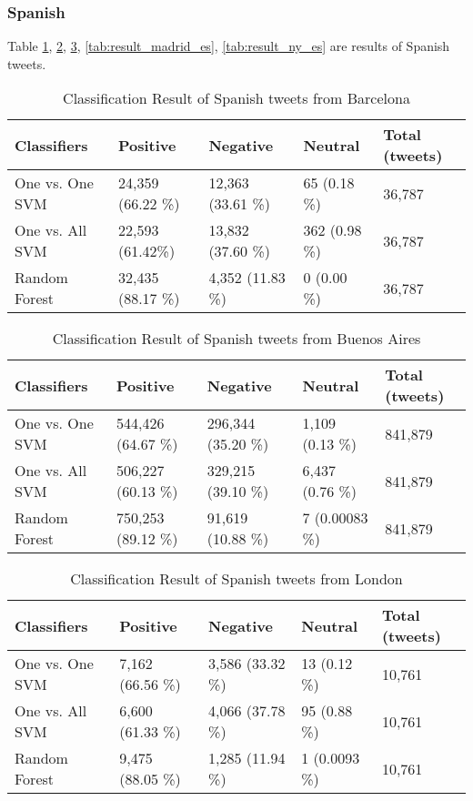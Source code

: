 \begin{comment}
London
N.Y or San Francisco

\end{comment}

\clearpage
\subsubsection{Spanish}
Table \ref{tab:result_barcelona_es}, \ref{tab:result_buenosaires_es}, \ref{tab:result_london_es}, \ref{tab:result_madrid_es}, \ref{tab:result_ny_es} are results of Spanish tweets.
\begin{table}[ht]
	\caption{Classification Result of Spanish tweets from Barcelona}
	\begin{tabular}{|l|p{1.8cm}|p{1.8cm}|p{1.8cm}|p{1.8cm}|} \hline
	Classifiers & Positive & Negative & Neutral & Total (tweets)\\ \hline
One vs. One SVM & 24,359 (66.22 \%)& 12,363 (33.61 \%)& 65 (0.18 \%) & 36,787\\ \hline
One vs. All SVM & 22,593 (61.42\%) & 13,832 (37.60 \%)& 362 (0.98 \%)& 36,787\\ \hline
Random Forest   & 32,435 (88.17 \%) & 4,352 (11.83 \%) & 0  (0.00 \%)& 36,787 \\ \hline
	\end{tabular}
	\label{tab:result_barcelona_es}
\end{table}


\begin{table}[ht]
	\caption{Classification Result of Spanish tweets from Buenos Aires}
	\begin{tabular}{|l|p{1.8cm}|p{1.8cm}|p{1.8cm}|p{1.8cm}|} \hline
	Classifiers & Positive & Negative & Neutral & Total (tweets)\\ \hline
One vs. One SVM & 544,426 (64.67 \%)& 296,344 (35.20 \%)& 1,109 (0.13 \%)& 841,879 \\ \hline
One vs. All SVM & 506,227 (60.13 \%)& 329,215 (39.10 \%)& 6,437 (0.76 \%)& 841,879 \\ \hline
Random Forest   & 750,253 (89.12 \%)& 91,619 (10.88 \%) & 7 (0.00083 \%) & 841,879 \\ \hline
	\end{tabular}
	\label{tab:result_buenosaires_es}
\end{table}

\begin{table}[ht]
	\caption{Classification Result of Spanish tweets from London}
	\begin{tabular}{|l|p{1.8cm}|p{1.8cm}|p{1.8cm}|p{1.8cm}|} \hline
	Classifiers & Positive & Negative & Neutral & Total (tweets)\\ \hline
	
One vs. One SVM & 7,162 (66.56 \%)& 3,586 (33.32 \%)& 13 (0.12 \%)& 10,761 \\ \hline
One vs. All SVM & 6,600 (61.33 \%)& 4,066 (37.78 \%)& 95 (0.88 \%)& 10,761 \\ \hline
Random Forest   & 9,475 (88.05 \%)& 1,285 (11.94 \%)& 1 (0.0093 \%) & 10,761 \\ \hline

	\end{tabular}
	\label{tab:result_london_es}
\end{table}



